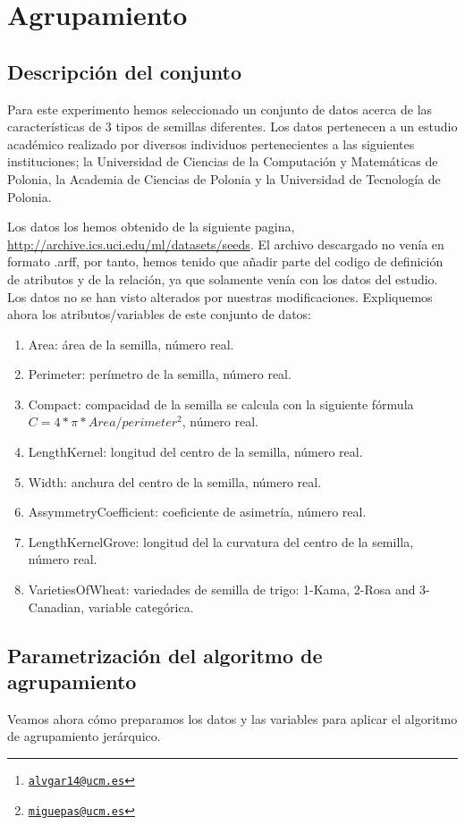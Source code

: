 \documentclass[a4paper, 11pt, twoside, openany, onecolumn, final]{memoir}
\title{\tb{Inteligencia artificial: Práctica $8$}}
\author{Álvaro García Tenorio \thanks{\texttt{\url{alvgar14@ucm.es}}}\and Miguel Pascual Domínguez\thanks{\texttt{\url{miguepas@ucm.es}}}}
\date{\today}
\begin{document}
	\maketitle
	\tableofcontents
	\chapter{Agrupamiento}
	\section{Descripción del conjunto}
	Para este experimento hemos seleccionado un conjunto de datos acerca de las características de 3 tipos de semillas diferentes. Los datos pertenecen a un estudio académico realizado por diversos individuos pertenecientes a las siguientes instituciones; la Universidad de Ciencias de la Computación y Matemáticas de Polonia, la Academia de Ciencias de Polonia y la Universidad de Tecnología de Polonia.
	
	Los datos los hemos obtenido de la siguiente pagina, \url{http://archive.ics.uci.edu/ml/datasets/seeds}. El archivo descargado no venía en formato .arff, por tanto, hemos tenido que añadir parte del codigo de definición de atributos y de la relación, ya que solamente venía con los datos del estudio. Los datos no se han visto alterados por nuestras modificaciones. Expliquemos ahora los atributos/variables de este conjunto de datos:
	
	\begin{enumerate}
\item Area: área de la semilla, número real.
\item Perimeter: perímetro de la semilla, número real.
\item Compact: compacidad de la semilla se calcula con la siguiente fórmula $C=4*\pi*Area/perimeter^2$, número real.
\item LengthKernel: longitud del centro de la semilla, número real.
\item Width: anchura del centro de la semilla, número real.
\item AssymmetryCoefficient: coeficiente de asimetría, número real. 
\item LengthKernelGrove: longitud del la curvatura del centro de la semilla, número real.
\item VarietiesOfWheat: variedades de semilla de trigo: 1-Kama, 2-Rosa and 3-Canadian, variable categórica.
\end{enumerate}
	\section{Parametrización del algoritmo de agrupamiento}
	Veamos ahora cómo preparamos los datos y las variables para aplicar el algoritmo de agrupamiento jerárquico.
	
\end{document}
